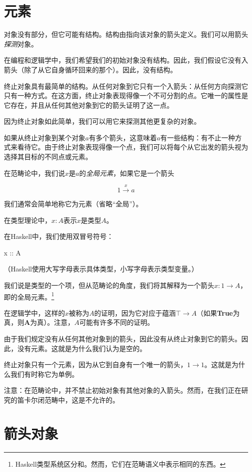 \documentclass[DaoFP]{subfiles}
\begin{document}
\section{元素}

对象没有部分，但它可能有结构。结构由指向该对象的箭头定义。我们可以用箭头\emph{探测}对象。

在编程和逻辑学中，我们希望我们的初始对象没有结构。因此，我们假设它没有入箭头（除了从它自身循环回来的那个）。因此，没有结构。

终止对象具有最简单的结构。从任何对象到它只有一个入箭头：从任何方向探测它只有一种方式。在这方面，终止对象表现得像一个不可分割的点。它唯一的属性是它存在，并且从任何其他对象到它的箭头证明了这一点。

因为终止对象如此简单，我们可以用它来探测其他更复杂的对象。

如果从终止对象到某个对象$a$有多个箭头，这意味着$a$有一些结构：有不止一种方式来看待它。由于终止对象表现得像一个点，我们可以将每个从它出发的箭头视为选择其目标的不同点或元素。

在范畴论中，我们说$ x$是$a$的\emph{全局元素}，如果它是一个箭头

\[ 1 \xrightarrow x a \]

我们通常会简单地称它为元素（省略“全局”）。

在类型理论中，$ x \colon A$表示$x$是类型$A$。

在Haskell中，我们使用双冒号符号：
\begin{haskell}
x :: A
\end{haskell}
（Haskell使用大写字母表示具体类型，小写字母表示类型变量。）

我们说是类型的一个项，但从范畴论的角度，我们将其解释为一个箭头$x : 1 \to A$，即的全局元素。\footnote{Haskell类型系统区分和。然而，它们在范畴语义中表示相同的东西。}

在逻辑学中，这样的$ x$被称为$ A$的证明，因为它对应于蕴涵$ \top \to A$（如果\textbf{True}为真，则\textbf{A}为真）。注意，$A$可能有许多不同的证明。

由于我们规定没有从任何其他对象到的箭头，因此没有从终止对象到它的箭头。因此，没有元素。这就是为什么我们认为是空的。

终止对象只有一个元素，因为从它到自身有一个唯一的箭头，$ 1 \to 1$。这就是为什么我们有时称它为单例。

注意：在范畴论中，并不禁止初始对象有其他对象的入箭头。然而，在我们正在研究的笛卡尔闭范畴中，这是不允许的。

\section{箭头对象}
\end{document}
